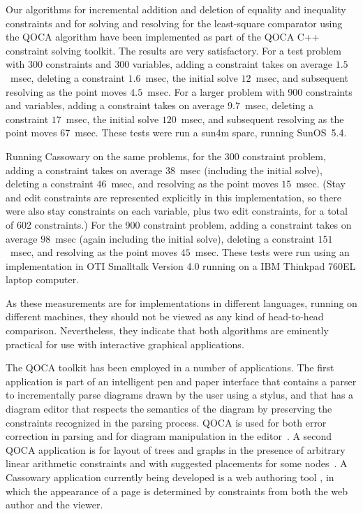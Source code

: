 \documentclass{uist96}
\begin{document}

Our algorithms for incremental addition and deletion of equality and inequality
constraints and for solving and resolving for the least-square comparator
using the QOCA algorithm have been implemented as part of the QOCA C++
constraint solving toolkit. 
The results are very satisfactory.
For a test problem with 300 constraints and
300 variables, adding a constraint takes
on average  $1.5$~msec, deleting a constraint $1.6$~msec, the initial
solve  $12$~msec, and subsequent resolving as the point moves $4.5$~msec.
For a larger problem with 900 constraints and variables,
adding a constraint takes
on average  $9.7$~msec, deleting a constraint $17$~msec, the initial
solve  $120$~msec, and subsequent resolving as the point moves $67$~msec.
These tests were run a sun4m sparc, running SunOS~5.4.

Running Cassowary on the same problems, for the 300 constraint problem,
adding a constraint takes on average $38$~msec (including the initial
solve), deleting a constraint $46$~msec, and resolving as the point moves
$15$~msec.  (Stay and edit constraints are represented explicitly in this
implementation, so there were also stay constraints on each variable, plus
two edit constraints, for a total of 602 constraints.)
For the 900 constraint problem, adding a constraint takes on
average $98$~msec (again including the initial solve), deleting a
constraint $151$~msec, and resolving as the point moves $45$~msec.  These
tests were run using an implementation in OTI Smalltalk Version 4.0 running
on a IBM Thinkpad 760EL laptop computer.

As these measurements are for implementations in different languages,
running on different machines, they should not be viewed as any kind of
head-to-head comparison.  Nevertheless, they indicate that both
algorithms are eminently practical for use with interactive graphical
applications.

The QOCA toolkit has been employed in a number of applications.
The first application is part of an intelligent pen and paper
interface that contains a parser to incrementally parse diagrams drawn by
the user using a stylus, and that has a diagram editor that respects
the semantics of the diagram by preserving the constraints recognized
in the parsing process.  QOCA is used for both error correction in
parsing and for diagram manipulation in the editor~\cite{chok-marriott95}.
A second QOCA application is for layout of trees and graphs in the
presence of arbitrary linear arithmetic constraints and with
suggested placements for some nodes~\cite{he-marriott96}.
A Cassowary application currently being developed 
is a web authoring tool
\cite{borning-multimedia-97}, in which the appearance of a page is
determined by constraints from both the web author and the viewer.  
\end{document}
